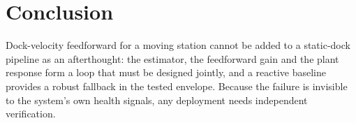 \documentclass[conference,a4paper]{IEEEtran}
\begin{document}
\section{Conclusion}

Dock-velocity feedforward for a moving station cannot be added to a static-dock pipeline as an afterthought: the estimator, the feedforward gain and the plant response form a loop that must be designed jointly, and a reactive baseline provides a robust fallback in the tested envelope. Because the failure is invisible to the system's own health signals, any deployment needs independent verification.



\end{document}
